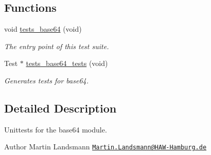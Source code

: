 \subsection*{Functions}
\begin{DoxyCompactItemize}
\item 
void \hyperlink{group__unittests_gad8db0d2b50c5b552f0173f6e55cc21b4}{tests\+\_\+base64} (void)
\begin{DoxyCompactList}\small\item\em The entry point of this test suite. \end{DoxyCompactList}\item 
Test $\ast$ \hyperlink{group__unittests_ga7104265274747d0e2711d4f44feb9362}{tests\+\_\+base64\+\_\+tests} (void)
\begin{DoxyCompactList}\small\item\em Generates tests for base64. \end{DoxyCompactList}\end{DoxyCompactItemize}


\subsection{Detailed Description}
Unittests for the {\ttfamily base64} module. 

\begin{DoxyAuthor}{Author}
Martin Landsmann \href{mailto:Martin.Landsmann@HAW-Hamburg.de}{\tt Martin.\+Landsmann@\+H\+A\+W-\/\+Hamburg.\+de} 
\end{DoxyAuthor}
